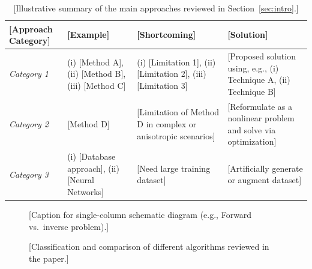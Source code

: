 \documentclass[final,5p,times,twocolumn]{elsarticle}
\begin{document}
\begin{table}[t]
    \centering
    \caption{[Illustrative summary of the main approaches reviewed in Section~\ref{sec:intro}.]}
    \label{tab:summary_methods}
    \small
    \begin{tabularx}{\textwidth}{L{2.8cm} Y Y Y}
        \toprule
        \textbf{[Approach Category]} & \textbf{[Example]} & \textbf{[Shortcoming]} & \textbf{[Solution]} \\
        \midrule
        \textit{Category 1} &
        (i) [Method A], \newline (ii) [Method B], \newline (iii) [Method C] &
        (i) [Limitation 1], \newline (ii) [Limitation 2], \newline (iii) [Limitation 3] &
        [Proposed solution using, e.g., (i) Technique A, (ii) Technique B] \\
        \addlinespace
        \textit{Category 2} &
        [Method D] &
        [Limitation of Method D in complex or anisotropic scenarios] &
        [Reformulate as a nonlinear problem and solve via optimization] \\
        \addlinespace
        \textit{Category 3} &
        (i) [Database approach], \newline (ii) [Neural Networks] &
        [Need large training dataset] &
        [Artificially generate or augment dataset] \\
        \bottomrule
    \end{tabularx}
\end{table}

\begin{figure}[t]
    \centering
    \caption{[Caption for single-column schematic diagram (e.g., Forward vs.\ inverse problem).]}
    \label{fig:schematic}
\end{figure}

\begin{figure}[t]
    \centering
    \caption{[Classification and comparison of different algorithms reviewed in the paper.]}
    \label{fig:comparison}
\end{figure}
\end{document}
